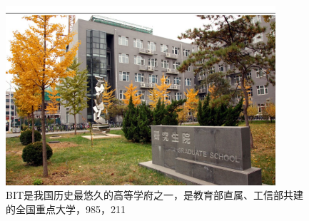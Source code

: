 \begin{figure}[!hbp]
  \centering
  \begin{minipage}[b]{0.6\textwidth}
  \captionstyle{\centering}
  \centering
  \includegraphics[width=10cm]{figures/pic2}
  \caption{BIT是我国历史最悠久的高等学府之一，是教育部直属、工信部共建的全国重点大学，985，211}
  \label{fig:longcaptiongood}
   \end{minipage}     
\end{figure}


